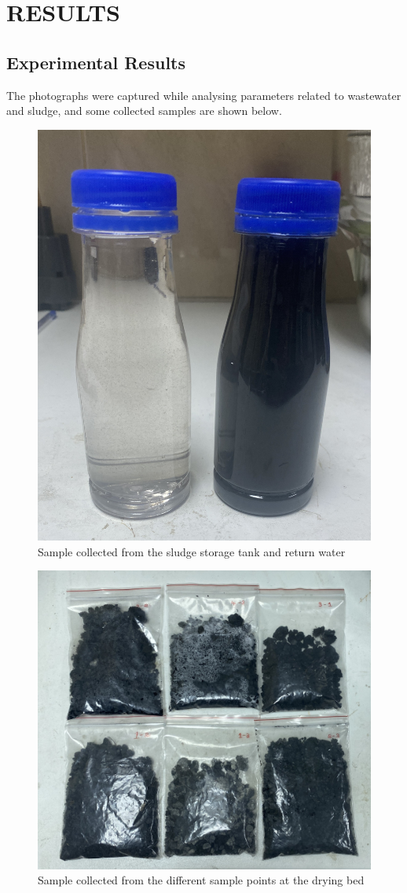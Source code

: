 \newpage
\section{RESULTS}

\subsection{Experimental Results}
The photographs were captured while analysing parameters related to wastewater and sludge, and some collected samples are shown below.








\begin{figure}[H]
\centering
\includegraphics[width=0.4\linewidth]{results/Sample storage tank and return water.jpg}
\caption{Sample collected from the sludge storage tank and return water}
\label{fig:Sample_storagetank_returnwater}
\end{figure}

\begin{figure}[H]
\centering
\includegraphics[width=0.6\linewidth]{results/Sample drying bed.jpg}
\caption{Sample collected from the different sample points at the drying bed}
\label{fig:Sample_dryingbed}
\end{figure}

